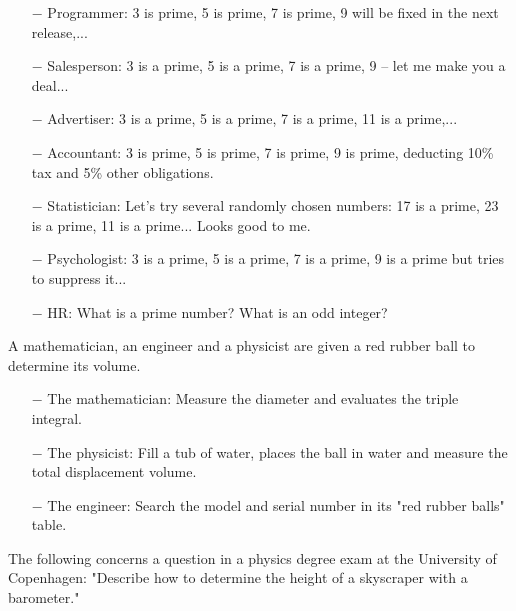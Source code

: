 \begin{itemize}
	\item[$-$] Programmer: 3 is prime, 5 is prime, 7 is prime, 9 will be fixed in the next release,...

	\item[$-$] Salesperson: 3 is a prime, 5 is a prime, 7 is a prime, 9 -- let me make you a deal...

	\item[$-$] Advertiser: 3 is a prime, 5 is a prime, 7 is a prime, 11 is a prime,...

	\item[$-$] Accountant: 3 is prime, 5 is prime, 7 is prime, 9 is prime, deducting 10\% tax and 5\% other obligations.

	\item[$-$] Statistician: Let's try several randomly chosen numbers: 17 is a prime, 23 is a prime, 11 is a prime... Looks good to me.

	\item[$-$] Psychologist: 3 is a prime, 5 is a prime, 7 is a prime, 9 is a prime but tries to suppress it... 
	
	\item[$-$] HR: What is a prime number? What is an odd integer?
\end{itemize}
	\begin{center}\underline{\hspace{5 cm}}\end{center}
	
A mathematician, an engineer and a physicist are given a red rubber ball to determine its volume.

\begin{itemize}	 
	\item[$-$] The mathematician: Measure the diameter and evaluates the triple integral.

	\item[$-$] The physicist: Fill a tub of water, places the ball in water and measure the total displacement volume.

	\item[$-$] The engineer: Search the model and serial number in its "red rubber balls" table.
\end{itemize}		
	\begin{center}\underline{\hspace{5 cm}}\end{center}

The following concerns a question in a physics degree exam at the University of Copenhagen: "Describe how to determine the height of a skyscraper with a barometer." 

